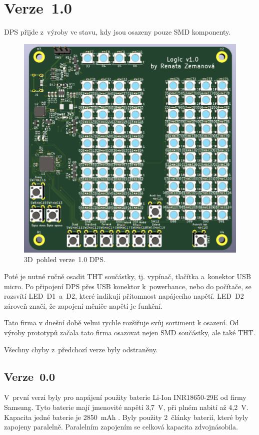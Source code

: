   \section{Verze~1.0}
  DPS přijde z~výroby ve stavu, kdy jsou osazeny pouze SMD komponenty. 

  \begin{figure}[!h]
    \begin{center}
      \includegraphics[scale=0.65]{obrazky/Verze1_3D_pohled.png}
    \end{center}
    \caption[3D~pohled verze~1.0 DPS]{3D~pohled verze~1.0 DPS.}
  \end{figure}

  Poté je nutné ručně osadit THT součástky, tj. vypínač, tlačítka a~konektor USB micro. Po připojení DPS přes USB konektor k~powerbance, 
  nebo do počítače, se rozsvítí LED~D1~a~D2, které indikují přítomnost napájecího napětí. LED~D2 zároveň značí, že zapojení měniče
  napětí je funkční.

  Tato firma v dnešní době 
  velmi rychle rozšiřuje svůj sortiment k osazení. Od výroby prototypů začala tato firma osazovat nejen SMD součástky, ale také THT.

  Všechny chyby z~předchozí verze byly odstraněny.

  \subsection{Verze~0.0}
  V~první verzi byly pro napájení použity baterie Li-Ion INR18650-29E od firmy Samsung. Tyto baterie mají jmenovité napětí 3,7~V, 
  při plném nabití až 4,2~V. Kapacita jedné baterie je 2850~mAh \cite{18650}. Byly použity 2~články baterií, které byly zapojeny paralelně. 
  Paralelním zapojením se celková kapacita zdvojnásobila.

